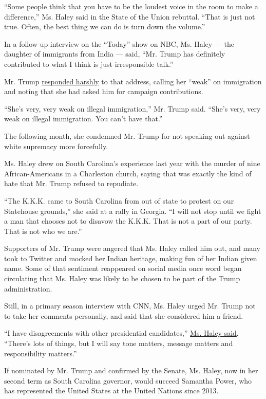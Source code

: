 ``Some people think that you have to be the loudest voice in the room to
make a difference,'' Ms. Haley said in the State of the Union rebuttal.
``That is just not true. Often, the best thing we can do is turn down
the volume.''

In a follow-up interview on the ``Today'' show on NBC, Ms. Haley --- the
daughter of immigrants from India --- said, ``Mr. Trump has definitely
contributed to what I think is just irresponsible talk.''

Mr. Trump
\href{http://www.nytimes.com/politics/first-draft/2016/02/18/donald-trump-turns-his-fire-on-nikki-haley/}{responded
harshly} to that address, calling her ``weak'' on immigration and noting
that she had asked him for campaign contributions.

``She's very, very weak on illegal immigration,'' Mr. Trump said.
``She's very, very weak on illegal immigration. You can't have that.''

The following month, she condemned Mr. Trump for not speaking out
against white supremacy more forcefully.

Ms. Haley drew on South Carolina's experience last year with the murder
of nine African-Americans in a Charleston church, saying that was
exactly the kind of hate that Mr. Trump refused to repudiate.

``The K.K.K. came to South Carolina from out of state to protest on our
Statehouse grounds,'' she said at a rally in Georgia. ``I will not stop
until we fight a man that chooses not to disavow the K.K.K. That is not
a part of our party. That is not who we are.''

Supporters of Mr. Trump were angered that Ms. Haley called him out, and
many took to Twitter and mocked her Indian heritage, making fun of her
Indian given name. Some of that sentiment reappeared on social media
once word began circulating that Ms. Haley was likely to be chosen to be
part of the Trump administration.

Still, in a primary season interview with CNN, Ms. Haley urged Mr. Trump
not to take her comments personally, and said that she considered him a
friend.

``I have disagreements with other presidential candidates,''
\href{https://www.youtube.com/watch?v=u0SOJkZFr5A}{Ms. Haley said}.
``There's lots of things, but I will say tone matters, message matters
and responsibility matters.''

If nominated by Mr. Trump and confirmed by the Senate, Ms. Haley, now in
her second term as South Carolina governor, would succeed Samantha
Power, who has represented the United States at the United Nations since
2013.

